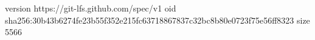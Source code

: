 version https://git-lfs.github.com/spec/v1
oid sha256:30b43b6274fe23b55f352e215fc63718867837c32bc8b80e0723f75e56ff8323
size 5566
